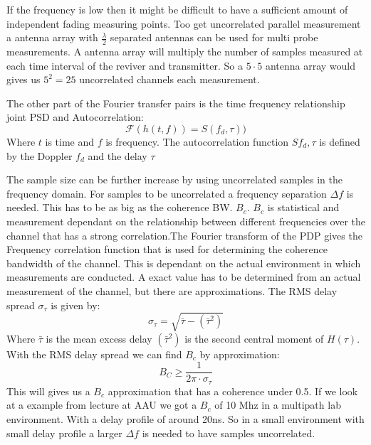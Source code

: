 If the frequency is low then it might be difficult to have a sufficient amount of independent fading measuring points. \citep[p.11]{UWMeasurement} Too get uncorrelated  parallel measurement a antenna array with $\frac{\lambda}{2}$ separated antennas can be used for multi probe measurements. A antenna array will multiply the number of samples measured at each time interval of the reviver and transmitter. So a $5\cdot 5$ antenna array would gives us $5^2 = 25$ uncorrelated channels each measurement.

The other part of the Fourier transfer pairs is the time frequency relationship joint PSD and Autocorrelation:
\begin{equation}
\mathcal{F} ( h(t,f) ) =
 S(f_d,\tau) )
\end{equation}
Where $t$ is time and $f$ is frequency. The autocorrelation function $S{f_d,\tau}$ is defined by the Doppler $f_d$ and the delay $\tau$



The sample size can be further increase by using uncorrelated samples in the frequency domain. 
For samples to be uncorrelated a frequency separation $\Delta f$  is needed. This has to be as big as the coherence BW. $B_{c}$. $B_{c}$ is statistical and measurement dependant on the relationship between different frequencies over the channel that has a strong correlation.The Fourier transform of the PDP gives the Frequency correlation function that is used for determining the coherence bandwidth of the channel. This is dependant on the actual environment in which measurements are conducted. A exact value has to be determined from  an actual measurement of the channel, but there are approximations\citep{RayFadeHandbook}. The RMS delay spread $\sigma_{\tau}$ is given by:
\begin{equation}
\sigma_{\tau} = \sqrt{\bar{\tau} - {(\bar{\tau}^{2})}}
\end{equation}
Where $\bar{\tau}$ is the mean excess delay $(\bar{\tau}^{2})$ is 
the second central moment of $H(\tau)$. With the RMS delay spread we can find $B_c$ by approximation:
\begin{equation}
B_C \geq \frac{1}{2\pi \cdot \sigma_{\tau}}
\label{CohBW}
\end{equation}
This will gives us a $B_c$ approximation that has a coherence under 0.5. 
\citep{CohBW}
If we look at a example from lecture at AAU we got a $B_c$ of 10 Mhz in a multipath lab environment.
 With a delay profile of around 20ns. So in a small environment with small delay profile a larger $\Delta f$ is needed to have samples uncorrelated.
\citep[Chapter 18.5]{ComHandbook}

